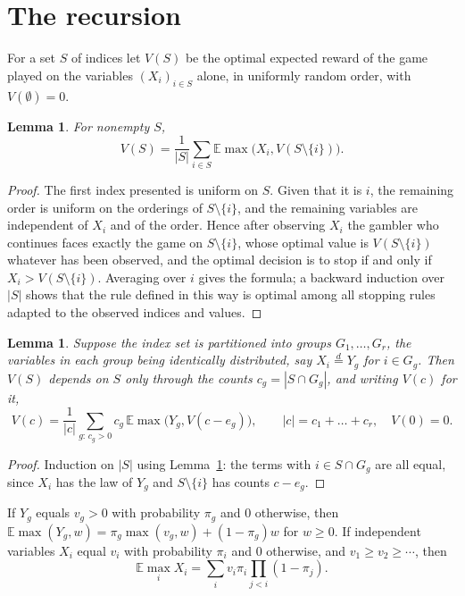 \documentclass[11pt]{amsart}
\newtheorem{lemma}[theorem]{Lemma}
\theoremstyle{remark}\newtheorem{remark}[theorem]{Remark}
\newcommand{\E}{\mathbb{E}}
\begin{document}
\section{The recursion}\label{sec:dp}

For a set $S$ of indices let $V(S)$ be the optimal expected reward of the game played on the variables $(X_i)_{i\in S}$
alone, in uniformly random order, with $V(\emptyset)=0$.

\begin{lemma}\label{lem:dp}
For nonempty $S$,
\[
V(S)=\frac1{|S|}\sum_{i\in S}\E\max\bigl(X_i,V(S\setminus\{i\})\bigr).
\]
\end{lemma}

\begin{proof}
The first index presented is uniform on $S$. Given that it is $i$, the remaining order is uniform on the orderings of
$S\setminus\{i\}$, and the remaining variables are independent of $X_i$ and of the order. Hence after observing $X_i$
the gambler who continues faces exactly the game on $S\setminus\{i\}$, whose optimal value is $V(S\setminus\{i\})$
whatever has been observed, and the optimal decision is to stop if and only if $X_i>V(S\setminus\{i\})$. Averaging over
$i$ gives the formula; a backward induction over $|S|$ shows that the rule defined in this way is optimal among all
stopping rules adapted to the observed indices and values.
\end{proof}

\begin{lemma}\label{lem:counts}
Suppose the index set is partitioned into groups $G_1,\dots,G_r$, the variables in each group being identically
distributed, say $X_i\overset{d}{=}Y_g$ for $i\in G_g$. Then $V(S)$ depends on $S$ only through the counts
$c_g=|S\cap G_g|$, and writing $V(c)$ for it,
\[
V(c)=\frac1{|c|}\sum_{g:\,c_g>0}c_g\,\E\max\bigl(Y_g,V(c-e_g)\bigr),\qquad |c|=c_1+\dots+c_r,\quad V(0)=0 .
\]
\end{lemma}

\begin{proof}
Induction on $|S|$ using Lemma~\ref{lem:dp}: the terms with $i\in S\cap G_g$ are all equal, since $X_i$ has the law of
$Y_g$ and $S\setminus\{i\}$ has counts $c-e_g$.
\end{proof}

If $Y_g$ equals $v_g>0$ with probability $\pi_g$ and $0$ otherwise, then
$\E\max(Y_g,w)=\pi_g\max(v_g,w)+(1-\pi_g)w$ for $w\ge0$. If independent variables $X_i$ equal $v_i$ with
probability $\pi_i$ and $0$ otherwise, and $v_1\ge v_2\ge\cdots$, then
\begin{equation}\label{eq:emax}
\E\max_i X_i=\sum_i v_i\pi_i\prod_{j<i}(1-\pi_j).
\end{equation}
\end{document}
